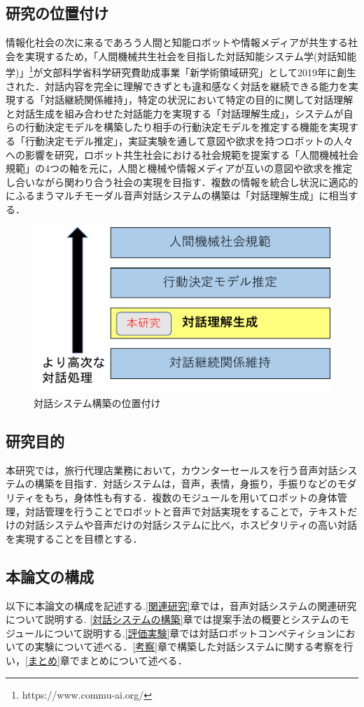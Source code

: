 \subsection{研究の位置付け}
情報化社会の次に来るであろう人間と知能ロボットや情報メディアが共生する社会を実現するため，「人間機械共生社会を目指した対話知能システム学(対話知能学)」\footnote{https://www.commu-ai.org/}が文部科学省科学研究費助成事業「新学術領域研究」として2019年に創生された．対話内容を完全に理解できずとも違和感なく対話を継続できる能力を実現する「対話継続関係維持」，特定の状況において特定の目的に関して対話理解と対話生成を組み合わせた対話能力を実現する「対話理解生成」，システムが自らの行動決定モデルを構築したり相手の行動決定モデルを推定する機能を実現する「行動決定モデル推定」，実証実験を通して意図や欲求を持つロボットの人々への影響を研究，ロボット共生社会における社会規範を提案する「人間機械社会規範」の4つの軸を元に，人間と機械や情報メディアが互いの意図や欲求を推定し合いながら関わり合う社会の実現を目指す．複数の情報を統合し状況に適応的にふるまうマルチモーダル音声対話システムの構築は「対話理解生成」に相当する．
\begin{figure}[th]
    \centering
    \includegraphics[scale=0.5]{pic/commuai.pdf}
    \caption{対話システム構築の位置付け}
    \label{commuai}
\end{figure}


\subsection{研究目的}
\label{研究目的}
本研究では，旅行代理店業務において，カウンターセールスを行う音声対話システムの構築を目指す．対話システムは，音声，表情，身振り，手振りなどのモダリティをもち，身体性も有する．複数のモジュールを用いてロボットの身体管理，対話管理を行うことでロボットと音声で対話実現をすることで，テキストだけの対話システムや音声だけの対話システムに比べ，ホスピタリティの高い対話を実現することを目標とする．

\subsection{本論文の構成}
\label{本論文の構成}
以下に本論文の構成を記述する.\ref{関連研究}章では，音声対話システムの関連研究について説明する. \ref{対話システムの構築}章では提案手法の概要とシステムのモジュールについて説明する.\ref{評価実験}章では対話ロボットコンペティションにおいての実験について述べる．\ref{考察}章で構築した対話システムに関する考察を行い，\ref{まとめ}章でまとめについて述べる．
